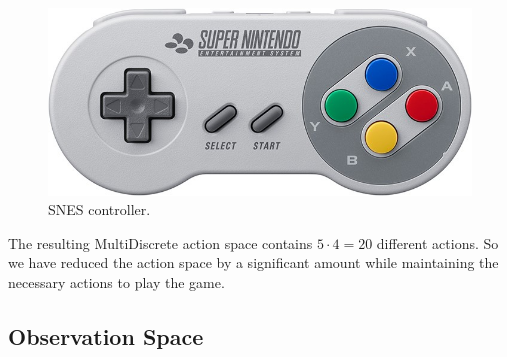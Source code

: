 \documentclass[a4paper]{article}
\begin{document}
\begin{figure}[htbp]
    \centering
    \includegraphics[width=.7\textwidth]{snes-controller}
    \caption{SNES controller.}
    \label{fig:snes-controller}
\end{figure}
The resulting MultiDiscrete action space contains $5\cdot4 = 20$ different actions.
So we have reduced the action space by a significant amount while maintaining the necessary actions to play the game.

\subsection{Observation Space}
\end{document}
